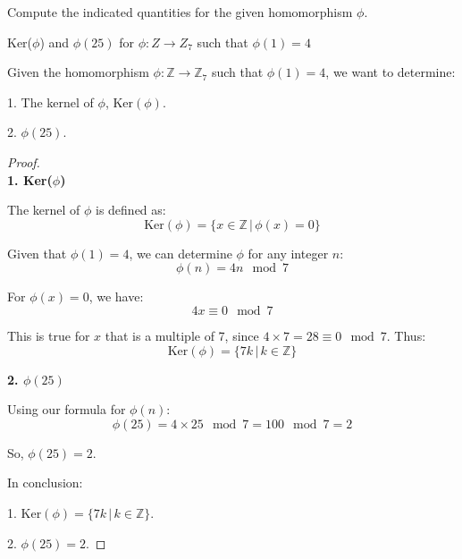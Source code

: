\documentclass[12pt]{amsart}
\theoremstyle{definition}
\numberwithin{equation}{section}
\theoremstyle{plain}
\begin{document}
\begin{exercise}{17} Compute the indicated quantities for the given homomorphism $\phi$.

    Ker($\phi$) and $\phi(25)$ for $\phi : Z \rightarrow Z_7$ such that $\phi(1) = 4$

    Given the homomorphism \( \phi : \mathbb{Z} \rightarrow \mathbb{Z}_7 \) such that \( \phi(1) = 4 \), we want to determine:
    
    1. The kernel of \( \phi \), \( \text{Ker}(\phi) \).

    2. \( \phi(25) \).
    
    \begin{proof} $ $ \\

\textbf{1. Ker(\( \phi \))}

The kernel of \( \phi \) is defined as:
\[
\text{Ker}(\phi) = \{ x \in \mathbb{Z} \,|\, \phi(x) = 0 \}
\]

Given that \( \phi(1) = 4 \), we can determine \( \phi \) for any integer \( n \):
\[
\phi(n) = 4n \mod 7
\]

For \( \phi(x) = 0 \), we have:
\[
4x \equiv 0 \mod 7
\]

This is true for \( x \) that is a multiple of 7, since \( 4 \times 7 = 28 \equiv 0 \mod 7 \). Thus:
\[
\text{Ker}(\phi) = \{ 7k \,|\, k \in \mathbb{Z} \}
\]

\textbf{2. \( \phi(25) \)}

Using our formula for \( \phi(n) \):
\[
\phi(25) = 4 \times 25 \mod 7 = 100 \mod 7 = 2
\]

So, \( \phi(25) = 2 \).

In conclusion:

1. \( \text{Ker}(\phi) = \{ 7k \,|\, k \in \mathbb{Z} \} \).

2. \( \phi(25) = 2 \).

    \end{proof}
\end{exercise}
\vspace*{20pt}
\end{document}
